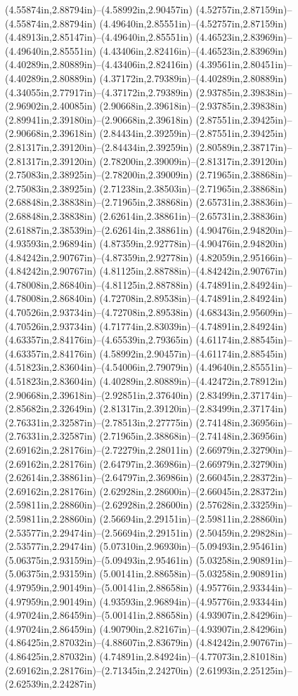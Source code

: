 (4.55874in,2.88794in)--(4.58992in,2.90457in) (4.52757in,2.87159in)--(4.55874in,2.88794in) (4.49640in,2.85551in)--(4.52757in,2.87159in) (4.48913in,2.85147in)--(4.49640in,2.85551in) (4.46523in,2.83969in)--(4.49640in,2.85551in) (4.43406in,2.82416in)--(4.46523in,2.83969in) (4.40289in,2.80889in)--(4.43406in,2.82416in) (4.39561in,2.80451in)--(4.40289in,2.80889in) (4.37172in,2.79389in)--(4.40289in,2.80889in) (4.34055in,2.77917in)--(4.37172in,2.79389in) (2.93785in,2.39838in)--(2.96902in,2.40085in) (2.90668in,2.39618in)--(2.93785in,2.39838in) (2.89941in,2.39180in)--(2.90668in,2.39618in) (2.87551in,2.39425in)--(2.90668in,2.39618in) (2.84434in,2.39259in)--(2.87551in,2.39425in) (2.81317in,2.39120in)--(2.84434in,2.39259in) (2.80589in,2.38717in)--(2.81317in,2.39120in) (2.78200in,2.39009in)--(2.81317in,2.39120in) (2.75083in,2.38925in)--(2.78200in,2.39009in) (2.71965in,2.38868in)--(2.75083in,2.38925in) (2.71238in,2.38503in)--(2.71965in,2.38868in) (2.68848in,2.38838in)--(2.71965in,2.38868in) (2.65731in,2.38836in)--(2.68848in,2.38838in) (2.62614in,2.38861in)--(2.65731in,2.38836in) (2.61887in,2.38539in)--(2.62614in,2.38861in) (4.90476in,2.94820in)--(4.93593in,2.96894in) (4.87359in,2.92778in)--(4.90476in,2.94820in) (4.84242in,2.90767in)--(4.87359in,2.92778in) (4.82059in,2.95166in)--(4.84242in,2.90767in) (4.81125in,2.88788in)--(4.84242in,2.90767in) (4.78008in,2.86840in)--(4.81125in,2.88788in) (4.74891in,2.84924in)--(4.78008in,2.86840in) (4.72708in,2.89538in)--(4.74891in,2.84924in) (4.70526in,2.93734in)--(4.72708in,2.89538in) (4.68343in,2.95609in)--(4.70526in,2.93734in) (4.71774in,2.83039in)--(4.74891in,2.84924in) (4.63357in,2.84176in)--(4.65539in,2.79365in) (4.61174in,2.88545in)--(4.63357in,2.84176in) (4.58992in,2.90457in)--(4.61174in,2.88545in) (4.51823in,2.83604in)--(4.54006in,2.79079in) (4.49640in,2.85551in)--(4.51823in,2.83604in) (4.40289in,2.80889in)--(4.42472in,2.78912in) (2.90668in,2.39618in)--(2.92851in,2.37640in) (2.83499in,2.37174in)--(2.85682in,2.32649in) (2.81317in,2.39120in)--(2.83499in,2.37174in) (2.76331in,2.32587in)--(2.78513in,2.27775in) (2.74148in,2.36956in)--(2.76331in,2.32587in) (2.71965in,2.38868in)--(2.74148in,2.36956in) (2.69162in,2.28176in)--(2.72279in,2.28011in) (2.66979in,2.32790in)--(2.69162in,2.28176in) (2.64797in,2.36986in)--(2.66979in,2.32790in) (2.62614in,2.38861in)--(2.64797in,2.36986in) (2.66045in,2.28372in)--(2.69162in,2.28176in) (2.62928in,2.28600in)--(2.66045in,2.28372in) (2.59811in,2.28860in)--(2.62928in,2.28600in) (2.57628in,2.33259in)--(2.59811in,2.28860in) (2.56694in,2.29151in)--(2.59811in,2.28860in) (2.53577in,2.29474in)--(2.56694in,2.29151in) (2.50459in,2.29828in)--(2.53577in,2.29474in) (5.07310in,2.96930in)--(5.09493in,2.95461in) (5.06375in,2.93159in)--(5.09493in,2.95461in) (5.03258in,2.90891in)--(5.06375in,2.93159in) (5.00141in,2.88658in)--(5.03258in,2.90891in) (4.97959in,2.90149in)--(5.00141in,2.88658in) (4.95776in,2.93344in)--(4.97959in,2.90149in) (4.93593in,2.96894in)--(4.95776in,2.93344in) (4.97024in,2.86459in)--(5.00141in,2.88658in) (4.93907in,2.84296in)--(4.97024in,2.86459in) (4.90790in,2.82167in)--(4.93907in,2.84296in) (4.86425in,2.87032in)--(4.88607in,2.83679in) (4.84242in,2.90767in)--(4.86425in,2.87032in) (4.74891in,2.84924in)--(4.77073in,2.81018in) (2.69162in,2.28176in)--(2.71345in,2.24270in) (2.61993in,2.25125in)--(2.62539in,2.24287in) 